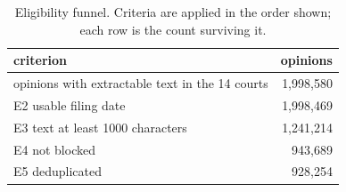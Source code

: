 \begin{table}[t]
\centering\small
\begin{tabular}{lr}
\toprule
criterion & opinions \\
\midrule
opinions with extractable text in the 14 courts & 1,998,580 \\
E2 usable filing date & 1,998,469 \\
E3 text at least 1000 characters & 1,241,214 \\
E4 not blocked & 943,689 \\
E5 deduplicated & 928,254 \\
\bottomrule
\end{tabular}
\caption{Eligibility funnel. Criteria are applied in the order shown; each row is the count surviving it.}
\label{tab:funnel}
\end{table}
